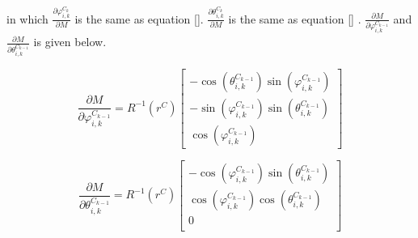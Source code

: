 \noindent in which $\frac{\partial \varphi _{i, k}^{C_{k}}}{\partial
  M}$ is the same as equation \ref{}. $\frac{\partial \theta _{i,
    k}^{C_{k}}}{\partial M}$ is the same as equation \ref{} . $\frac{\partial
  M}{\partial \varphi _{i,k}^{C_{k-1}}}$ and $ \frac{\partial
  M}{\partial \theta _{i, k}^{C_{k-1}}}$ is given below.

\begin{equation}
\frac{\partial M}{\partial \varphi_{i,k}^{C_{k-1}}}=
R^{-1}(r^{C})\begin{bmatrix}
-\cos(\theta_{i, k}^{C_{k-1}})\sin(\varphi_{i,k}^{C_{k-1}}) \\
-\sin(\varphi_{i,k}^{C_{k-1}})\sin(\theta_{i, k}^{C_{k-1}}) \\
\cos (\varphi_{i,k}^{C_{k-1}})
\end{bmatrix}
\end{equation}

\begin{equation}
\frac{\partial M}{\partial \theta _{i,k}^{C_{k-1}}}=
R^{-1}(r^{C}) \begin{bmatrix}
-\cos(\varphi_{i,k}^{C_{k-1}})\sin(\theta_{i, k}^{C_{k-1}})\\
\cos(\varphi_{i,k}^{C_{k-1}})\cos(\theta_{i, k}^{C_{k-1}})\\
0\\
\end{bmatrix}
\end{equation}

